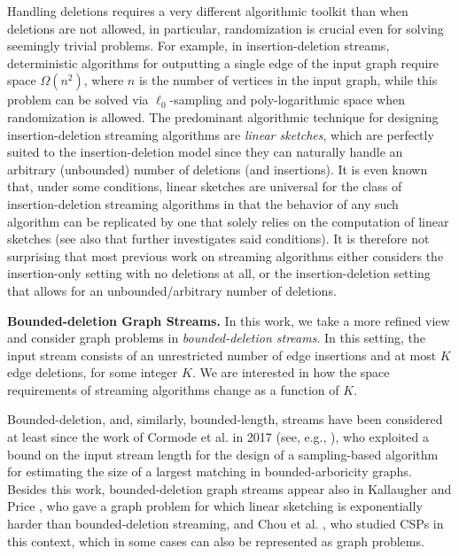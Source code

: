 \documentclass[11pt,a4paper]{article}
\begin{document}
Handling deletions requires a very different algorithmic toolkit than when deletions are not allowed, in particular, randomization is crucial   even for solving seemingly trivial problems. For example, in insertion-deletion streams, deterministic algorithms for outputting a single edge of the input graph require space $\Omega(n^2)$, where $n$ is the number of vertices in the input graph, while this problem can be solved via $\ell_0$-sampling \cite{jst11,cf14} and poly-logarithmic space when randomization is allowed. The predominant algorithmic technique for designing insertion-deletion streaming algorithms are  {\em linear sketches}, which are perfectly suited to the insertion-deletion model since they can naturally handle an arbitrary (unbounded) number of deletions (and insertions). It is even known that, under some conditions, linear sketches are universal for the class of insertion-deletion streaming algorithms in that the behavior of any such algorithm can be replicated by one that solely relies on the computation of linear sketches \cite{lnw14, ahlw16} (see also \cite{kp20} that further investigates said conditions). It is therefore not surprising that most previous work on streaming algorithms either considers the insertion-only setting with no deletions at all, or the insertion-deletion setting that allows for an unbounded/arbitrary number of deletions.

\smallskip
\noindent \textbf{Bounded-deletion Graph Streams.}
In this work, we take a more refined view and consider graph problems in {\em bounded-deletion streams}. In this setting, the input stream consists of an unrestricted number of edge insertions and at most $K$ edge deletions, for some integer $K$. We are interested in how the space requirements of streaming algorithms change as a function of $K$. 

Bounded-deletion, and, similarly, bounded-length, streams have been considered at least since the work of Cormode et al. \cite{cjmm17} in 2017 (see, e.g., \cite{cjmm17, bgw20, kp20, zmwaa21, agm12, zaam22, ejwy22, hkmms22,zaammr23,cgsv24}), who 
exploited a bound on the  input stream length for the design of a sampling-based algorithm for estimating the size of a largest matching in bounded-arboricity graphs. Besides this work, bounded-deletion graph streams appear also in Kallaugher and Price \cite{kp20}, who gave a graph problem for which linear sketching is exponentially harder than bounded-deletion streaming, and Chou et al. \cite{cgsv24}, who studied CSPs in this context, which in some cases can also be represented as graph problems. 
\end{document}

